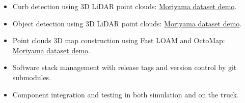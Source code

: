 \documentclass[a4paper,10pt,dvipdfmx]{article}
\begin{document}
\begin{itemize}
\begin{itemize}[noitemsep,nolistsep]
      \item Curb detection using 3D LiDAR point clouds: \href{https://youtu.be/ifXtkfOTIvU}{Moriyama dataset demo}.
      \item Object detection using 3D LiDAR point clouds: \href{https://youtu.be/fAb4NLzuoVs}{Moriyama dataset demo}.
      \item Point clouds 3D map construction using Fast LOAM and OctoMap: \href{https://youtu.be/j3xpDWPfBtw}{Moriyama dataset demo}.
      \item Software stack management with release tags and version control by git submodules.
      \item Component integration and testing in both simulation and on the truck.\\
    \end{itemize}
\end{itemize}
\end{document}
